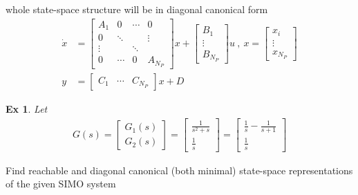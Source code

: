 \documentclass[twoside]{article}
\newtheorem{exmp}[theorem]{Ex}
\begin{document}
%
whole state-space structure will be in diagonal canonical form 
%
\begin{align*}
\dot{x} &= \left[ \begin{array}{cccc} A_1 & 0 & \cdots & 0 \\  0 & \ddots & & \vdots \\  \vdots  & & \ddots & 
\\  0  & \cdots & 0 & A_{N_P} \end{array} \right] x + 
\left[ \begin{array}{c} B_1 \\ \vdots \\ B_{N_P} \end{array} \right] u \ , \ x = \left[ \begin{array}{c} x_i \\ \vdots \\ x_{N_P} \end{array} \right]
\\
y &= \left[ \begin{array}{ccc} C_1 & \cdots & C_{N_P} \end{array} \right] x + D 
\end{align*}
%

\begin{exmp}
Let %
\begin{align*}
	G(s) = \left[ \begin{array}{c} G_1(s) \\ G_2(s) \end{array} \right] = 
	       \left[ \begin{array}{cc} \frac{ 1 }{ s^2 + s }  
	       \\ \frac{ 1 }{ s }   \end{array} \right] =  \left[ \begin{array}{cc} \frac{ 1 }{ s }  - \frac{ 1 }{ s + 1 } 
	       \\ \frac{ 1 }{ s }  \end{array} \right] 
\end{align*}
%  
\end{exmp}
%
Find reachable and diagonal canonical (both minimal) state-space representations of the given SIMO system
\end{document}
